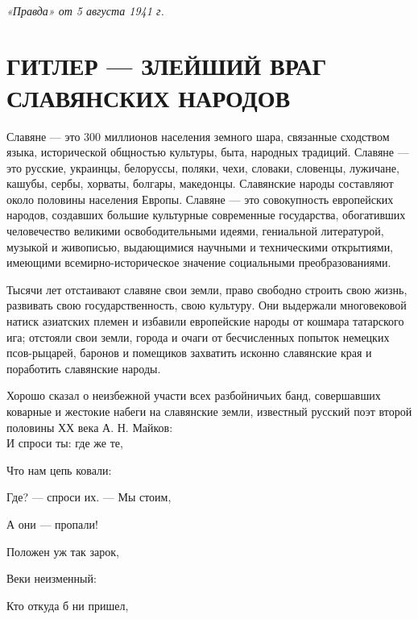 \documentclass[12pt, a4paper, openany]{book}
\begin{document}
\ \\

\noindent\textit{«Правда» от 5 августа 1941 г.}

\newpage

\section[Гитлер --- злейший враг славянских народов]{\center \textbf{ГИТЛЕР --- ЗЛЕЙШИЙ ВРАГ СЛАВЯНСКИХ НАРОДОВ}}	


Славяне — это 300 миллионов населения земного шара, связанные сходством языка, исторической общностью культуры, быта, народных традиций. Славяне — это русские, украинцы, белоруссы, поляки, чехи, словаки, словенцы, лужичане, кашубы, сербы, хорваты, болгары, македонцы. Славянские народы составляют около половины населения Европы. Славяне — это совокупность европейских народов, создавших большие культурные современные государства, обогативших человечество великими освободительными идеями, гениальной литературой, музыкой и живописью, выдающимися научными и техническими открытиями, имеющими всемирно-историческое значение социальными преобразованиями.

Тысячи лет отстаивают славяне свои земли, право свободно строить свою жизнь, развивать свою государственность, свою культуру. Они выдержали многовековой натиск азиатских племен и избавили европейские народы от кошмара татарского ига; отстояли свои земли, города и очаги от бесчисленных попыток немецких псов-рыцарей, баронов и помещиков захватить исконно славянские края и поработить славянские народы.

Хорошо сказал о неизбежной участи всех разбойничьих банд, совершавших коварные и жестокие набеги на славянские земли, известный русский поэт второй половины ХХ века А. Н. Майков:
\ \\

\hangindent=4.5cm  И спроси ты: где же те,

\hangindent=5.5cm  Что нам цепь ковали:

\hangindent=4.5cm  Где? — спроси их. — Мы стоим,

\hangindent=5.5cm  А они — пропали!

\hangindent=4.5cm  Положен уж так зарок,

\hangindent=5.5cm  Веки неизменный:

\hangindent=4.5cm  Кто откуда б ни пришел,
\end{document}

